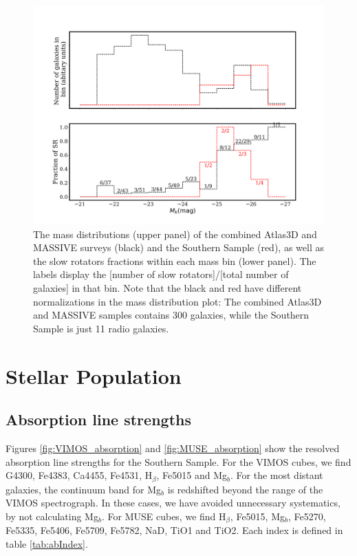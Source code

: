 		\begin{figure}
			\centering
			\includegraphics[width=\textwidth]{chapter4/M_k_binned.png}
			\caption[Mass matching global kinematics]{The mass distributions (upper panel) of the combined Atlas3D and MASSIVE surveys (black) and the Southern Sample (red), as well as the slow rotators fractions within each mass bin (lower panel). The labels display the [number of slow rotators]/[total number of galaxies] in that bin. Note that the black and red have different normalizations in the mass distribution plot: The combined Atlas3D and MASSIVE samples contains 300 galaxies, while the Southern Sample is just 11 radio galaxies.}
			\label{fig:SRmassFraction}
		\end{figure}


		





\section{Stellar Population}
	\label{sec:pop}

	\subsection{Absorption line strengths}
		\label{subsec:absorption}
		Figures \ref{fig:VIMOS_absorption} and \ref{fig:MUSE_absorption} show the resolved absorption line strengths for the Southern Sample. For the VIMOS cubes, we find G4300, Fe4383, Ca4455, Fe4531, H$_\beta$, Fe5015 and Mg$_b$. For the most distant galaxies, the continuum band for Mg$_b$ is redshifted beyond the range of the VIMOS spectrograph. In these cases, we have avoided unnecessary systematics, by not calculating Mg$_b$. For MUSE cubes, we find H$_\beta$, Fe5015, Mg$_b$, Fe5270, Fe5335, Fe5406, Fe5709, Fe5782, NaD, TiO1 and TiO2. Each index is defined in table \ref{tab:abIndex}. 

